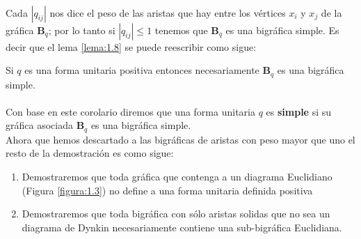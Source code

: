 \paragraph{}
Cada $|q_{ij}|$ nos dice el peso de las aristas que hay entre los vértices $x_{i}$ y $x_{j}$ de la gráfica $\textbf{B}_{q}$; por lo tanto si $|q_{ij}| \leq 1$ tenemos que $\textbf{B}_{q}$ es una bigráfica simple. Es decir que el lema \ref{lema:1.8} se puede reescribir como sigue:

\begin{corollary}
Si $q$ es una forma unitaria positiva entonces necesariamente $\textbf{B}_{q}$ es una bigráfica simple.
\label{corolario:1.9}
\end{corollary}

\paragraph{}
Con base en este corolario diremos que una forma unitaria $q$ es \textbf{simple} si su gráfica asociada $\textbf{B}_{q}$ es una bigráfica simple.\\
Ahora que hemos descartado a las bigráficas de aristas con peso mayor que uno el resto de la demostración es como sigue:

\begin{enumerate}
    \item Demostraremos que toda gráfica que contenga a un diagrama Euclidiano (Figura \ref{figura:1.3}) no define a una forma unitaria definida positiva
    \item Demostraremos que toda bigráfica con sólo aristas solidas que no sea un diagrama de Dynkin necesariamente contiene una sub-bigráfica Euclidiana.
\end{enumerate}

